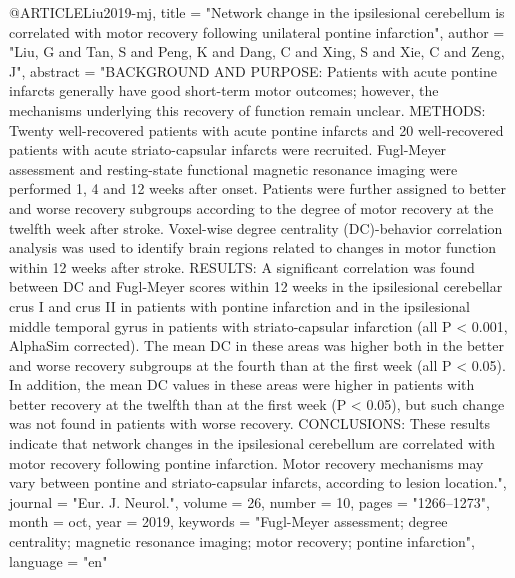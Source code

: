 @ARTICLE{Liu2019-mj,
	title    = "Network change in the ipsilesional cerebellum is correlated with
	motor recovery following unilateral pontine infarction",
	author   = "Liu, G and Tan, S and Peng, K and Dang, C and Xing, S and Xie, C
	and Zeng, J",
	abstract = "BACKGROUND AND PURPOSE: Patients with acute pontine infarcts
	generally have good short-term motor outcomes; however, the
	mechanisms underlying this recovery of function remain unclear.
	METHODS: Twenty well-recovered patients with acute pontine
	infarcts and 20 well-recovered patients with acute
	striato-capsular infarcts were recruited. Fugl-Meyer assessment
	and resting-state functional magnetic resonance imaging were
	performed 1, 4 and 12 weeks after onset. Patients were further
	assigned to better and worse recovery subgroups according to the
	degree of motor recovery at the twelfth week after stroke.
	Voxel-wise degree centrality (DC)-behavior correlation analysis
	was used to identify brain regions related to changes in motor
	function within 12 weeks after stroke. RESULTS: A significant
	correlation was found between DC and Fugl-Meyer scores within 12
	weeks in the ipsilesional cerebellar crus I and crus II in
	patients with pontine infarction and in the ipsilesional middle
	temporal gyrus in patients with striato-capsular infarction (all
	P < 0.001, AlphaSim corrected). The mean DC in these areas was
	higher both in the better and worse recovery subgroups at the
	fourth than at the first week (all P < 0.05). In addition, the
	mean DC values in these areas were higher in patients with better
	recovery at the twelfth than at the first week (P < 0.05), but
	such change was not found in patients with worse recovery.
	CONCLUSIONS: These results indicate that network changes in the
	ipsilesional cerebellum are correlated with motor recovery
	following pontine infarction. Motor recovery mechanisms may vary
	between pontine and striato-capsular infarcts, according to
	lesion location.",
	journal  = "Eur. J. Neurol.",
	volume   =  26,
	number   =  10,
	pages    = "1266--1273",
	month    =  oct,
	year     =  2019,
	keywords = "Fugl-Meyer assessment; degree centrality; magnetic resonance
	imaging; motor recovery; pontine infarction",
	language = "en"
}

